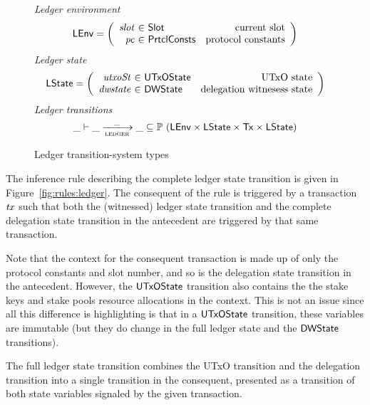 \documentclass[11pt,a4paper,dvipsnames]{article}
\newcommand{\Tx}{\type{Tx}}
\newcommand{\PrtclConsts}{\type{PrtclConsts}}
\newcommand{\Slot}{\type{Slot}}
\newcommand{\UTxOState}{\ensuremath{\type{UTxOState}}}
\newcommand{\DWState}{\type{DWState}}
\newcommand{\LEnv}{\type{LEnv}}
\newcommand{\LState}{\type{LState}}
\theoremstyle{definition}
\theoremstyle{definition}
\begin{document}
\begin{figure}
  \emph{Ledger environment}
  \begin{equation*}
    \LEnv =
    \left(
      \begin{array}{r@{~\in~}lr}
        \var{slot} & \Slot & \text{current slot}\\
        \var{pc} & \PrtclConsts & \text{protocol constants}\\
      \end{array}
    \right)
  \end{equation*}
  \emph{Ledger state}
  \begin{equation*}
    \LState =
    \left(
      \begin{array}{r@{~\in~}lr}
        \var{utxoSt} & \UTxOState & \text{UTxO state}\\
        \var{dwstate} & \DWState & \text{delegation witnesess state}\\
      \end{array}
    \right)
  \end{equation*}
  \emph{Ledger transitions}
  \begin{equation*}
    \_ \vdash
    \var{\_} \trans{ledger}{\_} \var{\_}
    \subseteq \powerset (\LEnv \times \LState \times \Tx \times \LState)
  \end{equation*}
  \caption{Ledger transition-system types}
  \label{fig:ts-types:ledger}
\end{figure}


The inference rule describing the complete ledger state transition is given in
Figure~\ref{fig:rules:ledger}. The consequent of the rule is triggered by
a transaction $\mathit{tx}$ such that both the (witnessed) ledger state transition
and the complete delegation state transition in the antecedent are
triggered by that same transaction.

Note that the context for the consequent transaction is made up of only the
protocol constants and slot number, and so is the delegation state transition in
the antecedent. However, the $\UTxOState$ transition also contains the the
stake keys and stake pools resource allocations in the context. This is not
an issue since all this difference is highlighting is that in a $\UTxOState$
transition, these variables are immutable (but they do change in the full
ledger state and the $\DWState$ transitions).

The full ledger state transition combines the UTxO transition and the
delegation transition into a single transition
in the consequent, presented as a transition of both state variables signaled
by the given transaction.
\end{document}
